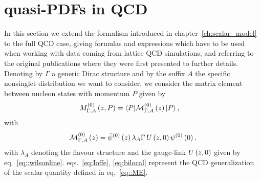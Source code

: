 \section{quasi-PDFs in QCD}
\label{sec:qPDFs_th}
%
In this section we extend the formalism introduced in chapter~\ref{ch:scalar_model} to the full QCD case,
giving formulas and expressions which have to be used when working with data coming from lattice QCD simulations,
and referring to the original publications where they were first presented to further details.
Denoting by $\Gamma$ a generic Dirac structure and by the suffix $A$ the specific nonsinglet distribution
we want to consider, we consider the matrix element between nucleon states with momentum $P$ given by
\begin{align}
	\label{eq:Ioffe}
	M^{(0)}_{\Gamma,A}\left(z,P\right) &= \langle P |\mathcal{M}^{(0)}_{\Gamma,A}\left(z\right) |P\rangle \, ,
\end{align}
with
\begin{align}
	\label{eq:bilocal}
	\mathcal{M}^{(0)}_{\Gamma,A}\left(z\right)= \bar{\psi}^{(0)}\left( z\right) \lambda_A \Gamma \,   
	U\left( z,0\right) \psi^{(0)}\left( 0\right).
\end{align}
with $\lambda_A$ denoting the flavour structure and the gauge-link $U\left( z,0\right)$ given by eq.~\eqref{eq::wilsonline}.
eqs.~\eqref{eq:Ioffe}, \eqref{eq:bilocal} represent the QCD generalization of the scalar quantity defined 
in eq.~\eqref{eq::ME}.

